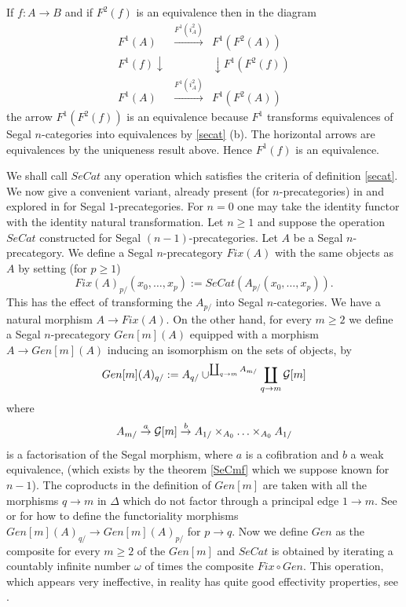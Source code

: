If $f: A\rightarrow B$ and if $F^2(f)$ is an equivalence then in the
diagram
$$
\begin{array}{ccc}
F^1(A) & \stackrel{F^1(i^2_A)}{\rightarrow} &  F^1(F^2(A))\\
{\scriptstyle F^1(f)}\downarrow && \downarrow {\scriptstyle F^1(F^2(f))}\\
F^1(A) & \stackrel{F^1(i^2_A)}{\rightarrow} &  F^1(F^2(A))
\end{array}
$$
the arrow $F^1(F^2(f))$ is an equivalence because $F^1$ transforms
equivalences of Segal $n$-categories into equivalences by
\ref{secat} (b). The horizontal arrows are equivalences by the
uniqueness result above. Hence $F^1(f)$ is an equivalence.
\eop


We shall call $SeCat$ any operation which satisfies the criteria of
definition \ref{secat}. We now give a convenient variant, already
present (for $n$-precategories) in \cite{nCAT} and explored
in \cite{effective} for
Segal $1$-precategories. For $n=0$ one may take the identity
functor with the identity natural transformation. Let $n\geq 1$
and suppose the operation $SeCat$ constructed for Segal $(n-1)$-precategories.
Let $A$ be a Segal $n$-precategory. We define a Segal $n$-precategory
$Fix(A)$
with the same objects as $A$ by setting (for $p\geq 1$) $$
Fix(A)_{p/}(x_0,\ldots , x_p):= SeCat(A_{p/}(x_0,\ldots , x_p)).
$$
This has the effect of transforming the $A_{p/}$ into Segal $n$-categories.
We have a natural morphism $A\rightarrow Fix(A)$.
On the other hand, for every $m\geq 2$ we define a Segal $n$-precategory
$Gen[m](A)$ equipped with a morphism $A\rightarrow Gen[m](A)$ inducing an
isomorphism on the sets of objects, by
$$
Gen[m](A)_{q/} := A_{q/} \cup ^{\coprod_{q\rightarrow m} A_{m/}}
\coprod _{q\rightarrow m}{\cal G} [m]
$$
where
$$
A_{m/}\stackrel{a}{\rightarrow} {\cal G} [m]
\stackrel{b}{\rightarrow} A_{1/}\times _{A_0}\ldots
\times _{A_0} A_{1/}
$$
is a factorisation of the Segal morphism, where $a$ is a
cofibration and $b$ a weak equivalence, (which exists by the theorem
\ref{SeCmf} which we suppose known for $n-1$). The coproducts in the definition
of $Gen[m]$ are taken with all the morphisms $q\rightarrow m$ in
$\Delta$ which
do not
factor through a principal edge $1\rightarrow m$. See
\cite{nCAT} or \cite{effective} for how to define
the functoriality morphisms $Gen[m](A)_{q/}\rightarrow
Gen[m](A)_{p/}$ for $p\rightarrow q$.
Now we define $Gen$ as the composite for every $m\geq 2$ of the
$Gen[m]$ and $SeCat$ is obtained by iterating a countably infinite
number $\omega$ of times the composite $Fix \circ Gen$.
This operation, which appears very ineffective, in reality has quite
good effectivity properties, see \cite{effective}.

